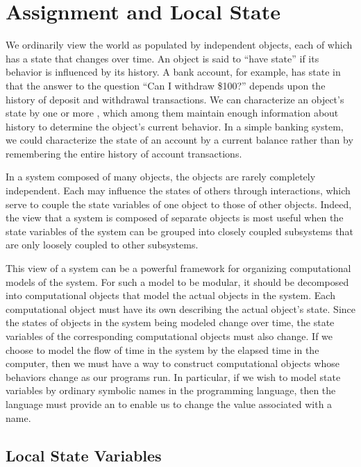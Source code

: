 \section{Assignment and Local State}
\label{Section 3.1}

We ordinarily view the world as populated by independent objects, each of which
has a state that changes over time.  An object is said to ``have state'' if its
behavior is influenced by its history.  A bank account, for example, has state
in that the answer to the question ``Can I withdraw \$100?''  depends upon the
history of deposit and withdrawal transactions.  We can characterize an
object's state by one or more , which among them
maintain enough information about history to determine the object's current
behavior.  In a simple banking system, we could characterize the state of an
account by a current balance rather than by remembering the entire history of
account transactions.

In a system composed of many objects, the objects are rarely completely
independent.  Each may influence the states of others through interactions,
which serve to couple the state variables of one object to those of other
objects.  Indeed, the view that a system is composed of separate objects is
most useful when the state variables of the system can be grouped into closely
coupled subsystems that are only loosely coupled to other subsystems.

This view of a system can be a powerful framework for organizing computational
models of the system.  For such a model to be modular, it should be decomposed
into computational objects that model the actual objects in the system.  Each
computational object must have its own 
describing the actual object's state.  Since the states of objects in the
system being modeled change over time, the state variables of the corresponding
computational objects must also change.  If we choose to model the flow of time
in the system by the elapsed time in the computer, then we must have a way to
construct computational objects whose behaviors change as our programs run.  In
particular, if we wish to model state variables by ordinary symbolic names in
the programming language, then the language must provide an  to enable us to change the value associated with a name.



\subsection{Local State Variables}
\label{Section 3.1.1}

